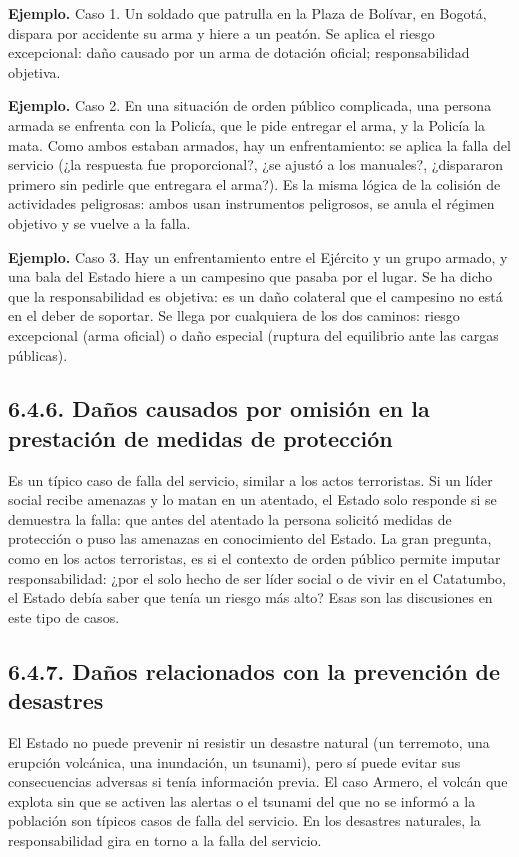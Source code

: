 \begin{ejemplo}
\textcolor[HTML]{4F6228}{\textbf{Ejemplo. }}Caso 1. Un soldado que patrulla en la Plaza de Bolívar, en Bogotá, dispara por accidente su arma y hiere a un peatón. Se aplica el riesgo excepcional: daño causado por un arma de dotación oficial; responsabilidad objetiva.
\par
\textcolor[HTML]{4F6228}{\textbf{Ejemplo. }}Caso 2. En una situación de orden público complicada, una persona armada se enfrenta con la Policía, que le pide entregar el arma, y la Policía la mata. Como ambos estaban armados, hay un enfrentamiento: se aplica la falla del servicio (¿la respuesta fue proporcional?, ¿se ajustó a los manuales?, ¿dispararon primero sin pedirle que entregara el arma?). Es la misma lógica de la colisión de actividades peligrosas: ambos usan instrumentos peligrosos, se anula el régimen objetivo y se vuelve a la falla.
\par
\textcolor[HTML]{4F6228}{\textbf{Ejemplo. }}Caso 3. Hay un enfrentamiento entre el Ejército y un grupo armado, y una bala del Estado hiere a un campesino que pasaba por el lugar. Se ha dicho que la responsabilidad es objetiva: es un daño colateral que el campesino no está en el deber de soportar. Se llega por cualquiera de los dos caminos: riesgo excepcional (arma oficial) o daño especial (ruptura del equilibrio ante las cargas públicas).
\end{ejemplo}
\subsection{6.4.6. Daños causados por omisión en la prestación de medidas de protección}
Es un típico caso de falla del servicio, similar a los actos terroristas. Si un líder social recibe amenazas y lo matan en un atentado, el Estado solo responde si se demuestra la falla: que antes del atentado la persona solicitó medidas de protección o puso las amenazas en conocimiento del Estado. La gran pregunta, como en los actos terroristas, es si el contexto de orden público permite imputar responsabilidad: ¿por el solo hecho de ser líder social o de vivir en el Catatumbo, el Estado debía saber que tenía un riesgo más alto? Esas son las discusiones en este tipo de casos.

\subsection{6.4.7. Daños relacionados con la prevención de desastres}
El Estado no puede prevenir ni resistir un desastre natural (un terremoto, una erupción volcánica, una inundación, un tsunami), pero sí puede evitar sus consecuencias adversas si tenía información previa. El caso Armero, el volcán que explota sin que se activen las alertas o el tsunami del que no se informó a la población son típicos casos de falla del servicio. En los desastres naturales, la responsabilidad gira en torno a la falla del servicio.

